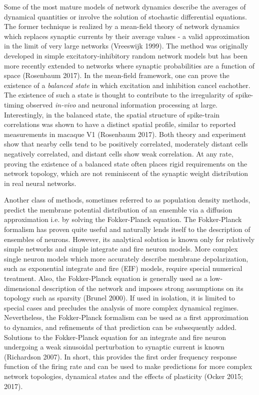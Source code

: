 \documentclass{ucetd}
\begin{document}
Some of the most mature models of network dynamics describe the averages of dynamical quantities or involve the solution of stochastic differential equations. The former technique is realized by a mean-field theory of network dynamics which replaces synaptic currents by their average values - a valid approximation in the limit of very large networks (Vreeswijk 1999). The method was originally developed in simple excitatory-inhibitory random network models but has been more recently extended to networks where synaptic probabilities are a function of space (Rosenbaum 2017). In the mean-field framework, one can prove the existence of a \emph{balanced state} in which excitation and inhibition cancel eachother. The existence of such a state is thought to contribute to the irregularity of spike-timing observed \emph{in-vivo} and neuronal information processing at large. Interestingly, in the balanced state, the spatial structure of spike-train correlations was shown to have a distinct spatial profile, similar to reported measurements in macaque V1 (Rosenbaum 2017). Both theory and experiment show that nearby cells tend to be positively correlated, moderately distant cells negatively correlated, and distant cells show weak correlation. At any rate, proving the existence of a balanced state often places rigid requirements on the network topology, which are not reminiscent of the synaptic weight distribution in real neural networks. 

Another class of methods, sometimes referred to as population density methods, predict the membrane potential distribution of an ensemble via a diffusion approximation i.e. by solving the Fokker-Planck equation. The Fokker-Planck formalism has proven quite useful and naturally lends itself to the description of ensembles of neurons. However, its analytical solution is known only for relatively simple networks and simple integrate and fire neuron models. More complex single neuron models which more accurately describe membrane depolarization, such as exponential integrate and fire (EIF) models, require special numerical treatment. Also, the Fokker-Planck equation is generally used as a low-dimensional description of the network and imposes strong assumptions on its topology such as sparsity (Brunel 2000). If used in isolation, it is limited to special cases and precludes the analysis of more complex dynamical regimes. Nevertheless, the Fokker-Planck formalism can be used as a first approximation to dynamics, and refinements of that prediction can be subsequently added. Solutions to the Fokker-Planck equation for an integrate and fire neuron undergoing a weak sinusoidal perturbation to synaptic current is known (Richardson 2007). In short, this provides the first order frequency response function of the firing rate and can be used to make predictions for more complex network topologies, dynamical states and the effects of plasticity (Ocker 2015; 2017). 
\end{document}
